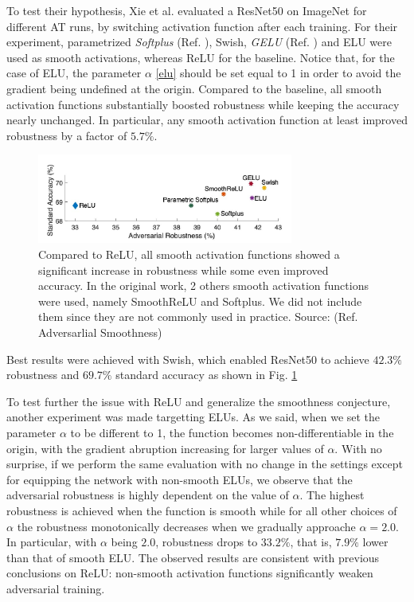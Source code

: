 \documentclass[LaM,binding=0.6cm]{./packages/sapthesis/sapthesis}
\begin{document}
    To test their hypothesis, Xie et al. evaluated a ResNet50 on ImageNet for different AT runs, by switching activation function after each training. For their experiment,
    parametrized \textit{Softplus} (Ref. ), Swish, \textit{GELU} (Ref. ) and ELU were used as smooth activations, whereas ReLU for the baseline. Notice that,
    for the case of ELU, the parameter $\alpha$ \ref{elu} should be set equal to 1 in order to avoid the gradient being undefined at the origin. Compared to the 
    baseline, all smooth activation functions substantially boosted robustness while keeping the accuracy nearly unchanged. In particular, any smooth activation 
    function at least improved robustness by a factor of $5.7\%$. 
    \begin{figure}[t]
        \centering
        \includegraphics[width=0.75\textwidth]{smoothresults}
        \caption{Compared to ReLU, all smooth activation functions showed a significant increase in robustness
        while some even improved accuracy. In the original work, 2 others smooth activation functions were used, namely 
        SmoothReLU and Softplus. We did not include them since they are not commonly used in practice. Source: (Ref. Adversarlial Smoothness)}
        \label{fig:smoothresults}
    \end{figure}
    Best results were achieved with Swish, which enabled
    ResNet50 to achieve $42.3\%$ robustness and $69.7\%$ standard accuracy as shown 
    in Fig. \ref{fig:smoothresults}

    To test further the issue with ReLU and generalize the smoothness conjecture, another 
    experiment was made targetting ELUs. As we said, when we set the parameter $\alpha$ to be different to 
    1, the function becomes non-differentiable in the origin, with the gradient
    abruption increasing for larger values of $\alpha$. With no surprise, if we perform the same evaluation with no change in the settings
    except for equipping the network with non-smooth ELUs,
    we observe that the adversarial robustness is highly dependent on the value of $\alpha$. 
    The highest robustness is achieved when the function is smooth while for all other choices of 
    $\alpha$ the robustness monotonically decreases when we gradually approache $\alpha = 2.0$. 
    In particular, with $\alpha$ being $2.0$, robustness drops to $33.2\%$, that is, $7.9\%$ lower than that of smooth ELU. 
    The observed results are consistent with previous conclusions on ReLU: non-smooth activation functions significantly
    weaken adversarial training.
\end{document}
